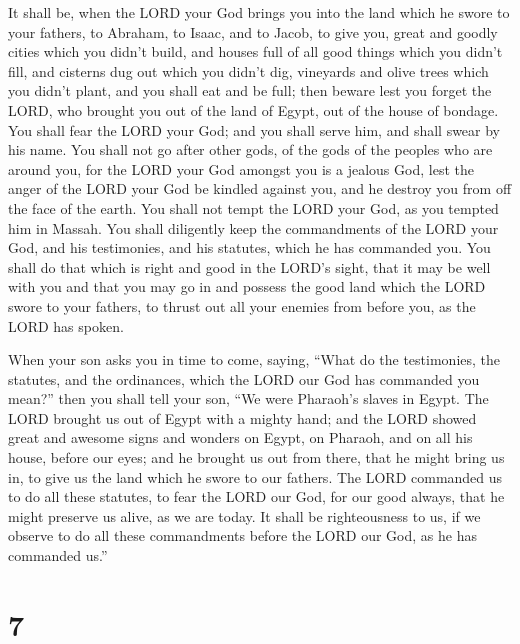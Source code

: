  It shall be, when the LORD your God brings you into the
land which he swore to your fathers, to Abraham, to Isaac, and to Jacob,
to give you, great and goodly cities which you didn't build,
 and houses full of all good things which you didn't
fill, and cisterns dug out which you didn't dig, vineyards and olive
trees which you didn't plant, and you shall eat and be full;
 then beware lest you forget the LORD, who brought you
out of the land of Egypt, out of the house of bondage. 
You shall fear the LORD your God; and you shall serve him, and shall
swear by his name.  You shall not go after other gods, of
the gods of the peoples who are around you,  for the LORD
your God amongst you is a jealous God, lest the anger of the LORD your
God be kindled against you, and he destroy you from off the face of the
earth.  You shall not tempt the LORD your God, as you
tempted him in Massah.  You shall diligently keep the
commandments of the LORD your God, and his testimonies, and his
statutes, which he has commanded you.  You shall do that
which is right and good in the LORD's sight, that it may be well with
you and that you may go in and possess the good land which the LORD
swore to your fathers,  to thrust out all your enemies
from before you, as the LORD has spoken.

 When your son asks you in time to come, saying, ``What
do the testimonies, the statutes, and the ordinances, which the LORD our
God has commanded you mean?''  then you shall tell your
son, ``We were Pharaoh's slaves in Egypt. The LORD brought us out of
Egypt with a mighty hand;  and the LORD showed great and
awesome signs and wonders on Egypt, on Pharaoh, and on all his house,
before our eyes;  and he brought us out from there, that
he might bring us in, to give us the land which he swore to our fathers.
 The LORD commanded us to do all these statutes, to fear
the LORD our God, for our good always, that he might preserve us alive,
as we are today.  It shall be righteousness to us, if we
observe to do all these commandments before the LORD our God, as he has
commanded us.''

\hypertarget{section-6}{%
\section{7}\label{section-6}}

